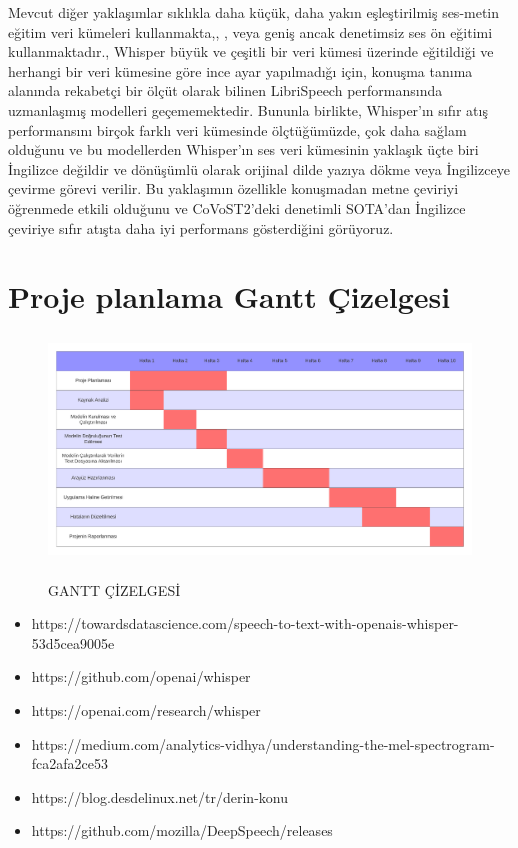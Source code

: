 \documentclass{article}
\begin{document}
	Mevcut diğer yaklaşımlar sıklıkla daha küçük, daha yakın eşleştirilmiş ses-metin eğitim veri kümeleri kullanmakta,\cite{DBLP:journals/corr/abs-2104-02133}, \cite{DBLP:journals/corr/abs-2111-09344},\cite{DBLP:journals/corr/abs-2106-06909} veya geniş ancak denetimsiz ses ön eğitimi kullanmaktadır.\cite{DBLP:journals/corr/abs-2006-11477}, \cite{Zhang_2022} Whisper büyük ve çeşitli bir veri kümesi üzerinde eğitildiği ve herhangi bir veri kümesine göre ince ayar yapılmadığı için, konuşma tanıma alanında rekabetçi bir ölçüt olarak bilinen LibriSpeech performansında uzmanlaşmış modelleri geçememektedir. Bununla birlikte, Whisper'ın sıfır atış performansını birçok farklı veri kümesinde ölçtüğümüzde, çok daha sağlam olduğunu ve bu modellerden %
	Whisper'ın ses veri kümesinin yaklaşık üçte biri İngilizce değildir ve dönüşümlü olarak orijinal dilde yazıya dökme veya İngilizceye çevirme görevi verilir. Bu yaklaşımın özellikle konuşmadan metne çeviriyi öğrenmede etkili olduğunu ve CoVoST2'deki denetimli SOTA'dan İngilizce çeviriye sıfır atışta daha iyi performans gösterdiğini görüyoruz.
	
	\section{Proje planlama Gantt Çizelgesi}
	\begin{figure}[!htbp]
		\caption{GANTT ÇİZELGESİ}
		\centering
		\includegraphics[width=15cm,
		height=6cm,
		keepaspectratio]{ganttchart.png}
		\label{gantt}
	\end{figure}
	\newpage
	
	


 
	\begin{itemize}
		\item https://towardsdatascience.com/speech-to-text-with-openais-whisper-53d5cea9005e
		\item https://github.com/openai/whisper
		\item https://openai.com/research/whisper
		\item https://medium.com/analytics-vidhya/understanding-the-mel-spectrogram-fca2afa2ce53
		\item https://blog.desdelinux.net/tr/derin-konu%
		\item https://github.com/mozilla/DeepSpeech/releases
	\end{itemize}
\end{document}

